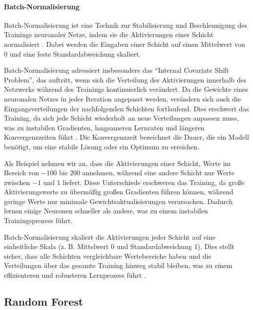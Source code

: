 \pagebreak
\paragraph{Batch-Normalisierung}
Batch-Normalisierung ist eine Technik zur Stabilisierung und Beschleunigung des Trainings neuronaler Netze, indem sie die Aktivierungen einer Schicht normalisiert \cite{Ioffe2015}.  
Dabei werden die Eingaben einer Schicht auf einen Mittelwert von 0 und eine feste Standardabweichung skaliert.  

Batch-Normalisierung adressiert insbesondere das \enquote{Internal Covariate Shift Problem}, das auftritt, wenn sich die Verteilung der Aktivierungen innerhalb des Netzwerks während des Trainings kontinuierlich verändert.  
Da die Gewichte eines neuronalen Netzes in jeder Iteration angepasst werden, verändern sich auch die Eingangsverteilungen der nachfolgenden Schichten fortlaufend. Dies erschwert das Training, da sich jede Schicht wiederholt an neue Verteilungen anpassen muss, was zu instabilen Gradienten, langsameren Lernraten und längeren Konvergenzzeiten führt \cite{Ioffe2015}.  
Die Konvergenzzeit bezeichnet die Dauer, die ein Modell benötigt, um eine stabile Lösung oder ein Optimum zu erreichen.


Als Beispiel nehmen wir an, dass die Aktivierungen einer Schicht, Werte im Bereich von $-100$ bis $200$ annehmen, während eine andere Schicht nur Werte zwischen $-1$ und $1$ liefert.  
Diese Unterschiede erschweren das Training, da große Aktivierungswerte zu übermäßig großen Gradienten führen können, während geringe Werte nur minimale Gewichtsaktualisierungen verursachen.  
Dadurch lernen einige Neuronen schneller als andere, was zu einem instabilen Trainingsprozess führt.  

Batch-Normalisierung skaliert die Aktivierungen jeder Schicht auf eine einheitliche Skala (z. B. Mittelwert 0 und Standardabweichung 1).  
Dies stellt sicher, dass alle Schichten vergleichbare Wertebereiche haben und die Verteilungen über das gesamte Training hinweg stabil bleiben, was zu einem effizienteren und robusteren Lernprozess führt \cite{Ioffe2015}.

\subsection{Random Forest}

